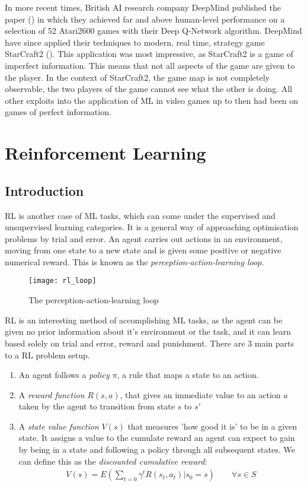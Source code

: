 In more recent times, British AI research company DeepMind published the paper (\cite{deepmind1}) in which they achieved far and above
human-level performance on a selection of 52 Atari2600 games with their Deep Q-Network algorithm.
DeepMind have since applied their techniques to modern, real time, strategy game StarCraft2
(\cite{starcraft}). This application was most impressive, as StarCraft2 is a game of imperfect
information. This means that not all aspects of the game are given to the player. In the context of
StarCraft2, the game map is not completely observable, the two players of the game cannot see what
the other is doing. All other exploits into the application of ML in video games up to then had been
on games of perfect information.

\section{Reinforcement Learning}
\subsection{Introduction}
RL is another case of ML tasks, which can come under the supervised and unsupervised learning
categories. It is a general way of approaching optimisation problems by trial and error. An agent
carries out actions in an environment, moving from one state to a new state and is given some
positive or negative numerical reward. This is known as the \textit{perception-action-learning
    loop}.

\begin{figure}[h]
    \texttt{[image: rl\_loop]}
    \centering
    \caption{The perception-action-learning loop}
\end{figure}

RL is an interesting method of accomplishing ML tasks, as the agent can be given no prior
information about it's environment or the task, and it can learn based solely on trial and error,
reward and punishment. There are 3 main parts to a RL problem setup.

\begin{enumerate}
    \item An agent follows a \textit{policy} $\pi$, a rule that maps a state to an action.
    \item A \textit{reward function} $R(s, a)$, that gives an immediate value to an action $a$ taken
          by the agent to transition from state $s$ to $s'$
    \item A \textit{state value function} $V(s)$ that measures 'how good it is' to be in a given
          state. It assigns a value to the cumulate reward an agent can expect to gain by being in a
          state and following a policy through all subsequent states. We can define this as the
          \textit{discounted cumulative reward}:
          \begin{align}
              V(s) = E(\sum_{t=0}\gamma^tR(s_t, a_t) | s_0 = s) \qquad \forall s \in S
          \end{align}
\end{enumerate}

